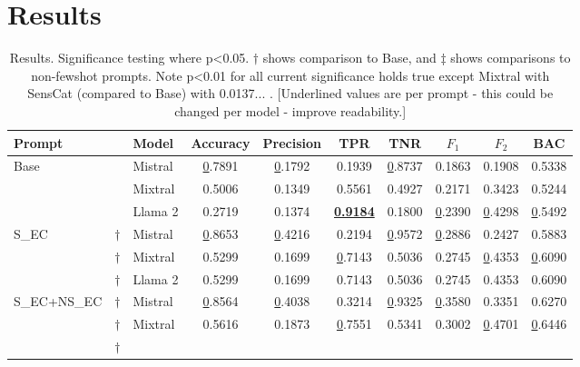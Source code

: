 \section{Results}

\begin{table*}[!h]
\centering
\caption{Results. Significance testing where p<0.05. $\dagger$ shows comparison to Base, and $\ddagger$ shows comparisons to non-fewshot prompts. Note p<0.01 for all current significance holds true except Mixtral with SensCat (compared to Base) with 0.0137... . [Underlined values are per prompt - this could be changed per model - improve readability.]}
\label{table:results}
\begin{tabular}{@{}lclccccccc@{}}
\toprule
Prompt &
  &
  Model &
  Accuracy &
  Precision &
  TPR &
  TNR &
  $F_{1}$ &
  $F_{2}$ &
  BAC \\ \midrule
\multirow{3}{*}{Base} &
  &
  Mistral &
  {\ul 0.7891} &
  {\ul 0.1792} &
  0.1939 &
  {\ul 0.8737} &
  0.1863 &
  0.1908 &
  0.5338 \\
 &
  &
  Mixtral &
  0.5006 &
  0.1349 &
  0.5561 &
  0.4927 &
  0.2171 &
  0.3423 &
  0.5244 \\
 &
  &
  Llama 2 &
  0.2719 &
  0.1374 &
  {\ul \textbf{0.9184}} &
  0.1800 &
  {\ul 0.2390} &
  {\ul 0.4298} &
  {\ul 0.5492} \\ \cmidrule(l){3-10}
\multirow{3}{*}{S\_EC} &
  $\dagger$ \hspace{0.46em} &
  Mistral &
  {\ul 0.8653} &
  {\ul 0.4216} &
  0.2194 &
  {\ul 0.9572} &
  {\ul 0.2886} &
  0.2427 &
  0.5883 \\
 &
  $\dagger$ \hspace{0.46em} &
  Mixtral &
  0.5299 &
  0.1699 &
  {\ul 0.7143} &
  0.5036 &
  0.2745 &
  {\ul 0.4353} &
  {\ul 0.6090} \\
 &
  $\dagger$ \hspace{0.46em} &
  Llama 2 &
  0.5299 &
  0.1699 &
  0.7143 &
  0.5036 &
  0.2745 &
  0.4353 &
  0.6090 \\ \cmidrule(l){3-10}
\multirow{3}{*}{S\_EC+NS\_EC} &
  $\dagger$ \hspace{0.46em} &
  Mistral &
  {\ul 0.8564} &
  {\ul 0.4038} &
  0.3214 &
  {\ul 0.9325} &
  {\ul 0.3580} &
  0.3351 &
  0.6270 \\
 &
  $\dagger$ \hspace{0.46em} &
  Mixtral &
  0.5616 &
  0.1873 &
  {\ul 0.7551} &
  0.5341 &
  0.3002 &
  {\ul 0.4701} &
  {\ul 0.6446} \\
 &
  $\dagger$ \hspace{0.46em} &

\end{tabular}
\end{table*}
